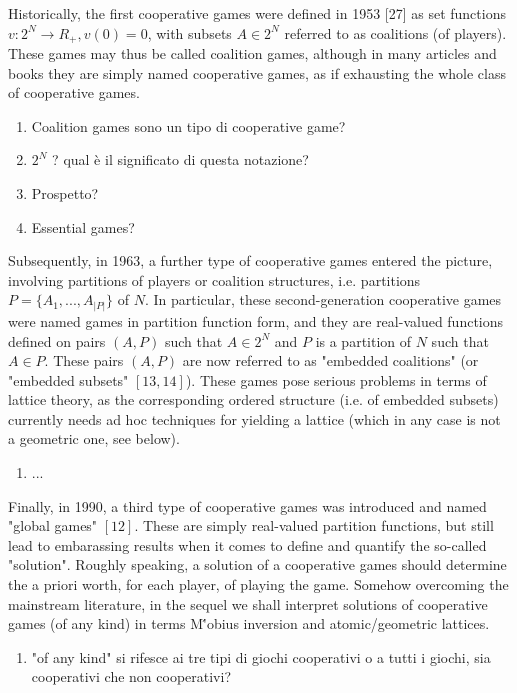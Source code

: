 	Historically, the first cooperative games were defined in 1953 [27] as set functions $v : 2^N \to R_+,v(0)=0$, with subsets $A \in 2^N$ referred to as coalitions (of players). These games may thus be called coalition games, although in many articles and books they are simply named cooperative games, as if exhausting the whole class of cooperative games.
			\begin{enumerate}
				\item Coalition games sono un tipo di cooperative game?
				\item $2^N$ ? qual \`e il significato di questa notazione?
				\item Prospetto?
				\item Essential games?
			\end{enumerate}
	
	Subsequently, in 1963, a further type of cooperative games entered the picture, involving partitions of players or coalition structures, i.e. partitions $P = \{A_1, ..., A_{|P|}\}$ of $N$. In particular, these second-generation cooperative games were named games in partition function form, and they are real-valued functions defined on pairs $(A, P)$ such that $A \in 2^N$ and $P$ is a partition of $N$ such that $A \in P$. These pairs $(A,P)$ are now referred to as "embedded coalitions" (or "embedded subsets" $[13, 14]$). These games pose serious problems in terms of lattice theory, as the corresponding ordered structure (i.e. of embedded subsets) currently needs ad hoc techniques for yielding a lattice (which in any case is not a geometric one, see below). 
			\begin{enumerate}
				\item ...
			\end{enumerate}
		
	Finally, in 1990, a third type of cooperative games was introduced and named "global games" $[12]$. These are simply real-valued partition functions, but still lead to embarassing results when it comes to define and quantify the so-called "solution". Roughly speaking, a solution of a cooperative games should determine the a priori worth, for each player, of playing the game. Somehow overcoming the mainstream literature, in the sequel we shall interpret solutions of cooperative games (of any kind) in terms M\''{o}bius inversion and atomic/geometric lattices.
			\begin{enumerate}
				\item "of any kind" si rifesce ai tre tipi di giochi cooperativi o a tutti i giochi, sia cooperativi che non cooperativi?
			\end{enumerate}	
